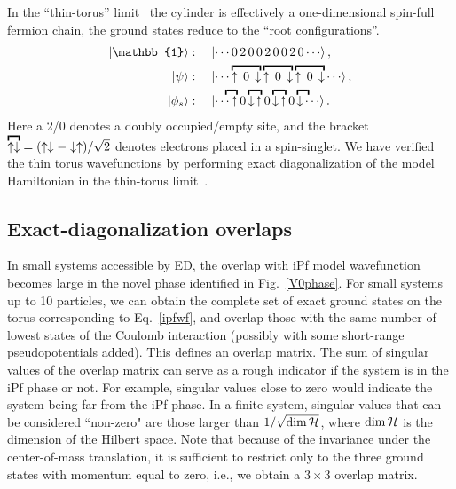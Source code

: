 In the ``thin-torus'' limit~\cite{TaoThouless:1983, Seidel, Bergholtz} the cylinder is effectively a one-dimensional spin-full fermion chain, the ground states reduce to the ``root configurations''.
\begin{subequations}\begin{align}
	\ket{\mathbb{1}} &:\quad	\ket{ \cdots 0\,2\,0\,0\,2\,0\,0\,2\,0 \cdots} ,
\\	\ket{\psi} &:\quad	\ket{ \cdots \overbracket{\up\,0\,\dn} \overbracket{\up\,0\,\dn} \overbracket{\up\,0\,\dn} \cdots } ,
\\	\ket{\spinon} &:\quad	\ket{ \cdots \!\!\!\overbracket{\,\,\,\up} 0 \overbracket{\dn\hspace{0.3ex}\up} 0 \overbracket{\dn\hspace{0.3ex}\up} 0 \overbracket{\dn\,\,\,}\!\!\! \cdots} .
	\label{eq:rootcfg_s}
\end{align}\end{subequations}
Here a 2/0 denotes a doubly occupied/empty site, and the bracket $\overbracket{\up\dn} = (\up\dn-\dn\up)/\sqrt{2}$ denotes electrons placed in a spin-singlet.
We have verified the thin torus wavefunctions by performing exact diagonalization of the model Hamiltonian in the thin-torus limit~\cite{Ardonne11}.


\subsection{Exact-diagonalization overlaps}
\label{sec:ed_overlap}


In small systems accessible by ED, the overlap with iPf model wavefunction becomes large in the novel phase identified in Fig.~\ref{V0phase}.
For small systems up to 10 particles, we can obtain the complete set of exact ground states on the torus corresponding to Eq.~\ref{ipfwf}, and overlap those with the same number of lowest states of the Coulomb interaction (possibly with some short-range pseudopotentials added).
This defines an overlap matrix. The sum of singular values of the overlap matrix can serve as a rough indicator if the system is in the iPf phase or not. For example, singular values close to zero would indicate the system being far from the iPf phase. In a finite system, singular values that can be considered ``non-zero" are those larger than $1/\sqrt{\operatorname{dim}\cal{H}}$, where $\operatorname{dim}\cal{H}$ is the dimension of the Hilbert space. Note that because of the invariance under the center-of-mass translation, it is sufficient to restrict only to the three ground states with momentum equal to zero, i.e., we obtain a $3\times3$ overlap matrix.

